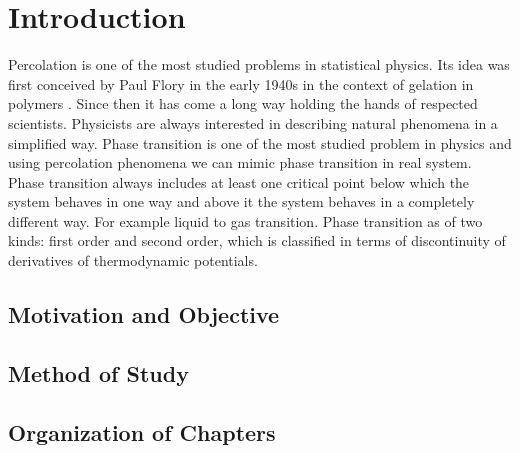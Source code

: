 
\ifpdf
\graphicspath{{Chapter1/Figs/Raster/}{Chapter1/Figs/PDF/}{Chapter1/Figs/}}
\else
\graphicspath{{Chapter1/Figs/Vector/}{Chapter1/Figs/}}
\fi

\chapter{Introduction}  %
Percolation is one of the most studied problems in statistical physics. Its idea was first conceived by Paul Flory in the early 1940s in the context of gelation in polymers \cite{Flory1941}. Since then it has come a long way holding the hands of respected scientists. Physicists are always interested in describing natural phenomena in a simplified way. Phase transition is one of the most studied problem in physics and using percolation phenomena we can mimic phase transition in real system. Phase transition always includes at least one critical point below which the system behaves in one way and above it the system behaves in a completely different way. For example liquid to gas transition. Phase transition as of two kinds: first order and second order, which is classified in terms of discontinuity of derivatives of thermodynamic potentials.

\section{Motivation and Objective} %

\section{Method of Study}  %

\section{Organization of Chapters}
